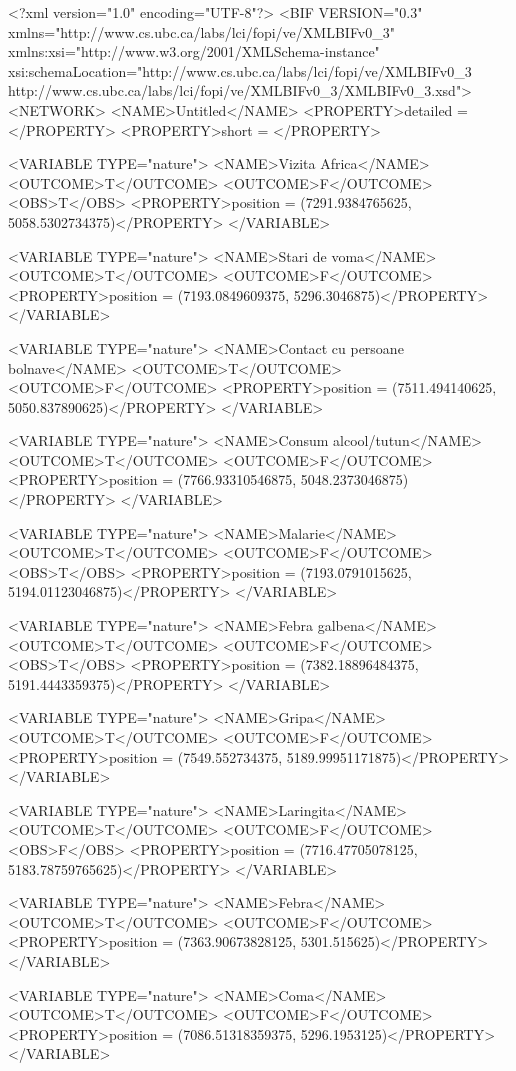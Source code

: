 \begingroup\makeatletter{}
\verbatim

<?xml version="1.0" encoding="UTF-8"?>
<BIF VERSION="0.3"  xmlns="http://www.cs.ubc.ca/labs/lci/fopi/ve/XMLBIFv0_3"
	xmlns:xsi="http://www.w3.org/2001/XMLSchema-instance"
	xsi:schemaLocation="http://www.cs.ubc.ca/labs/lci/fopi/ve/XMLBIFv0_3
 http://www.cs.ubc.ca/labs/lci/fopi/ve/XMLBIFv0_3/XMLBIFv0_3.xsd">
<NETWORK>
<NAME>Untitled</NAME>
<PROPERTY>detailed = </PROPERTY>
<PROPERTY>short = </PROPERTY>

<VARIABLE TYPE="nature">
	<NAME>Vizita Africa</NAME>
	<OUTCOME>T</OUTCOME>
	<OUTCOME>F</OUTCOME>
	<OBS>T</OBS>
	<PROPERTY>position = (7291.9384765625, 5058.5302734375)</PROPERTY>
</VARIABLE>

<VARIABLE TYPE="nature">
	<NAME>Stari de voma</NAME>
	<OUTCOME>T</OUTCOME>
	<OUTCOME>F</OUTCOME>
	<PROPERTY>position = (7193.0849609375, 5296.3046875)</PROPERTY>
</VARIABLE>

<VARIABLE TYPE="nature">
	<NAME>Contact cu persoane bolnave</NAME>
	<OUTCOME>T</OUTCOME>
	<OUTCOME>F</OUTCOME>
	<PROPERTY>position = (7511.494140625, 5050.837890625)</PROPERTY>
</VARIABLE>

<VARIABLE TYPE="nature">
	<NAME>Consum alcool/tutun</NAME>
	<OUTCOME>T</OUTCOME>
	<OUTCOME>F</OUTCOME>
	<PROPERTY>position = (7766.93310546875, 5048.2373046875)</PROPERTY>
</VARIABLE>

<VARIABLE TYPE="nature">
	<NAME>Malarie</NAME>
	<OUTCOME>T</OUTCOME>
	<OUTCOME>F</OUTCOME>
	<OBS>T</OBS>
	<PROPERTY>position = (7193.0791015625, 5194.01123046875)</PROPERTY>
</VARIABLE>

<VARIABLE TYPE="nature">
	<NAME>Febra galbena</NAME>
	<OUTCOME>T</OUTCOME>
	<OUTCOME>F</OUTCOME>
	<OBS>T</OBS>
	<PROPERTY>position = (7382.18896484375, 5191.4443359375)</PROPERTY>
</VARIABLE>

<VARIABLE TYPE="nature">
	<NAME>Gripa</NAME>
	<OUTCOME>T</OUTCOME>
	<OUTCOME>F</OUTCOME>
	<PROPERTY>position = (7549.552734375, 5189.99951171875)</PROPERTY>
</VARIABLE>

<VARIABLE TYPE="nature">
	<NAME>Laringita</NAME>
	<OUTCOME>T</OUTCOME>
	<OUTCOME>F</OUTCOME>
	<OBS>F</OBS>
	<PROPERTY>position = (7716.47705078125, 
5183.78759765625)</PROPERTY>
</VARIABLE>

<VARIABLE TYPE="nature">
	<NAME>Febra</NAME>
	<OUTCOME>T</OUTCOME>
	<OUTCOME>F</OUTCOME>
	<PROPERTY>position = (7363.90673828125, 
5301.515625)</PROPERTY>
</VARIABLE>

<VARIABLE TYPE="nature">
	<NAME>Coma</NAME>
	<OUTCOME>T</OUTCOME>
	<OUTCOME>F</OUTCOME>
	<PROPERTY>position = (7086.51318359375, 
5296.1953125)</PROPERTY>
</VARIABLE>

